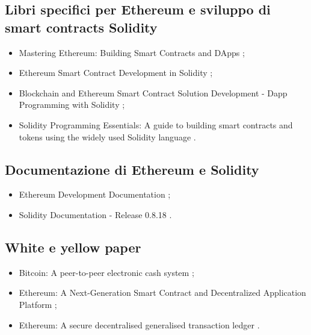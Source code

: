 \subsection*{Libri specifici per Ethereum e sviluppo di smart contracts Solidity}
\begin{itemize}

\item Mastering Ethereum: Building Smart Contracts and DApps \cite{antonopoulos2018ethereum};

\item Ethereum Smart Contract Development in Solidity \cite{zheng2020solidity};

\item Blockchain and Ethereum Smart Contract Solution Development - Dapp Programming with Solidity \cite{zhang2022solidity};

\item Solidity Programming Essentials: A guide to building smart contracts and tokens using the widely used Solidity language \cite{modi2022solidity}.

\end{itemize}

\subsection*{Documentazione di Ethereum e Solidity}
\begin{itemize}

\item Ethereum Development Documentation \cite{ethereum2024doc};

\item Solidity Documentation - Release 0.8.18 \cite{solidity0.8.18doc}.

\end{itemize}

\subsection*{White e yellow paper}
\begin{itemize}
	
\item Bitcoin: A peer-to-peer electronic cash system \cite{nakamoto2008bitcoin};

\item Ethereum: A Next-Generation Smart Contract and Decentralized Application Platform \cite{buterin2014ethereumwhite};

\item Ethereum: A secure decentralised generalised transaction ledger \cite{wood2024ethereumyellow}.

\end{itemize}

